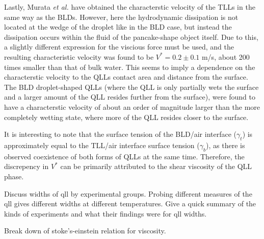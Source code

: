 Lastly, Murata \textit{et al.} have obtained the characterstic
velocity of the TLLs in the same way as the BLDs. However, here the
hydrodynamic dissipation is not located at the wedge of the droplet
like in the BLD case, but instead the dissipation occurs within the
fluid of the pancake-shape object itself. Due to this, a slightly
different expression for the viscious force must be used, and the
resulting characteristic velocity was found to be $V^* = 0.2 \pm 0.1$
m/s, about 200 times smaller than that of bulk water. This seems to
imply a dependence on the characterstic velocity to the QLLs contact
area and distance from the surface. The BLD droplet-shaped QLLs (where
the QLL is only partially wets the surface and a larger amount of the
QLL resides further from the surface), were found to have a
characterstic velocity of about an order of magnitude larger than the
more completely wetting state, where more of the QLL resides closer to
the surface.

It is interesting to note that the surface tension of the BLD/air
interface ($\gamma_t$) is approximately equal to the TLL/air interface
surface tension ($\gamma_b$), as there is observed coexistence of both
forms of QLLs at the same time. Therefore, the discrepency in $V^*$
can be primarily attributed to the shear viscosity of the QLL phase.
 


Discuss widths of qll by experimental groups. Probing different
measures of the qll gives different widths at different
temperatures. Give a quick summary of the kinds of experiments and
what their findings were for qll widths.




Break down of stoke's-einstein relation for viscosity. \cite{Chen2006, Tarjus1995,Bordat2003,Kumar2006}